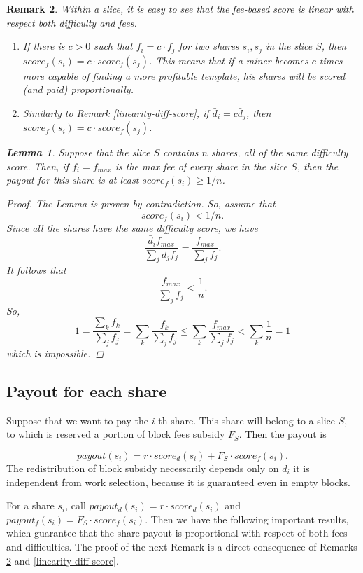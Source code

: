 \documentclass[10pt]{article}
\newtheorem{remark}{Remark}[subsection]
\newtheorem{lemma}[remark]{Lemma}
\begin{document}
\begin{remark}\label{linearity-fee-score}
Within a slice, it is easy to see that the fee-based score is linear with respect both difficulty and fees.
\begin{enumerate} 
\item If there is $c>0$ such that $f_i = c\cdot f_j$ for two shares $s_i, s_j$ in the slice $S$, then $score_f(s_i) = c \cdot score_f(s_j)$. This means that if a miner becomes $c$ times more capable of finding a more profitable template, his shares will be scored (and paid) proportionally.
\item Similarly to Remark  \ref{linearity-diff-score}, if $\bar d_i = c \bar d_j$, then $score_f(s_i) = c \cdot score_f(s_j)$.
\end{enumerate}

\begin{lemma}\label{better-miner-gets-paid-fairly}
Suppose that the slice $S$ contains $n$ shares, all of the same difficulty score. Then, if $f_i = f_{max}$ is the max fee of every share in the slice $S$, then the payout for this share is at least $score_f(s_i) \ge 1/n$. 
\end{lemma}
\begin{proof}
The Lemma is proven by contradiction. So, assume that 
\[score_f(s_i) < 1/n.\]
Since all the shares have the same difficulty score, we have 
\[\frac{\bar d_if_{max}}{\sum_j d_j f_j} = \frac{f_{max}}{\sum_j f_j}.\]It follows that
\[ \frac{f_{max}}{\sum_j f_j} <\frac{1} {n}.\]
So,
\[ 1 = \frac{\sum_k f_k}{\sum_j f_j} = \sum_k \frac {f_k}{\sum_j f_j} \le \sum_k \frac{f_{max}}{\sum_j f_j}<\sum_k\frac{1}{n} = 1\]
which is impossible.
\end{proof}

\end{remark}
\subsection{Payout for each share}
Suppose that we want to pay the $i$-th share. This share will belong to a slice $S$, to which is reserved a portion of block fees subsidy $F_S$. Then the payout is

\[payout(s_i) = r\cdot score_d(s_i) + F_S \cdot score_f(s_i).\]
 The redistribution of block subsidy necessarily depends only on $d_i$ it is independent from work selection, because it is guaranteed even in empty blocks.
 
For a share $s_i$, call $payout_d(s_i) = r\cdot score_d(s_i)$ and $payout_f(s_i) = F_S \cdot score_f(s_i)$. Then we have the following important results, which guarantee that the share payout is proportional with respect of both fees and difficulties. The proof of the next Remark is a direct consequence of Remarks \ref{linearity-fee-score} and \ref{linearity-diff-score}.
\end{document}
